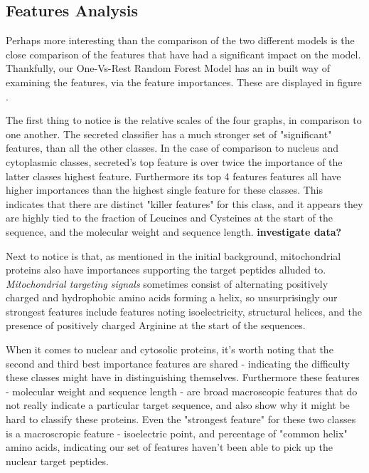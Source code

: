 \documentclass{bioinfo}
\begin{document}
\subsection{Features Analysis}

Perhaps more interesting than the comparison of the two different models is the close comparison of the features that have had a significant impact on the model.
Thankfully, our One-Vs-Rest Random Forest Model has an in built way of examining the features, via the feature importances.
These are displayed in figure .

The first thing to notice is the relative scales of the four graphs, in comparison to one another. The secreted classifier has a much stronger set of "significant" features, than all the other classes. In the case of comparison to nucleus and cytoplasmic classes, secreted's top feature is over twice the importance of the latter classes highest feature. Furthermore its top 4 features features all have higher importances than the highest single feature for these classes.  This indicates that there are distinct "killer features" for this class, and it appears they are highly tied to the fraction of Leucines and Cysteines at the start of the sequence, and the molecular weight and sequence length. \textbf{investigate data?}

Next to notice is that, as mentioned in the initial background, mitochondrial proteins also have importances supporting the target peptides alluded to. 
\textit{Mitochondrial targeting signals} sometimes consist of alternating positively charged and hydrophobic amino acids forming a helix, so unsurprisingly our strongest features include features noting isoelectricity, structural helices, and the presence of positively charged Arginine at the start of the sequences.

When it comes to nuclear and cytosolic proteins, it's worth noting that the second and third best importance features are shared - indicating the difficulty these  classes might have in distinguishing themselves.  Furthermore these features - molecular weight and sequence length - are broad macroscopic features that do not really indicate a particular target sequence, and also show why it might be hard to classify these proteins. Even the "strongest feature" for these two classes is a macroscropic feature - isoelectric point, and percentage of "common helix" amino acids, indicating our set of features haven't been able to pick up the nuclear target peptides.
\end{document}
